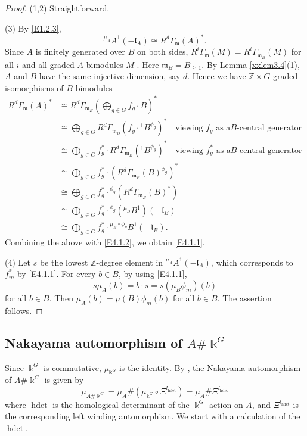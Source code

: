 \begin{proof}
(1,2) Straightforward.

(3) By \eqref{E1.2.3}, 
\begin{equation}
\label{E4.1.2}\tag{E4.1.2}
{^{\mu_A} A^1} (-{\mathfrak l}_A)\cong R^d 
\Gamma_{\mathfrak{m}}(A)^*.
\end{equation} 
Since $A$ is finitely generated over $B$ 
on both sides, $R^i\Gamma_{\mathfrak{m}}(M)=R^i\Gamma_{{\mathfrak{m}}_B}(M)$ for
all $i$ and all graded $A$-bimodules $M$ \cite{AZ}. Here ${\mathfrak{m}}_B=
B_{\geq 1}$. By Lemma \ref{xxlem3.4}(1),
$A$ and $B$ have the same injective dimension, say $d$.
Hence we have ${\mathbb Z}\times G$-graded isomorphisms
of $B$-bimodules
$$\begin{aligned}
R^d\Gamma_{\mathfrak{m}}(A)^*
&\cong R^d\Gamma_{{\mathfrak{m}}_B}(\bigoplus_{g\in G} f_g \cdot B)^*\\
&\cong \bigoplus_{g\in G} 
R^d\Gamma_{{\mathfrak{m}}_B}( f_g \cdot {^1 B^{\phi_g}})^* \quad {\text{viewing $f_g$ as a
$B$-central generator}}\\
&\cong \bigoplus_{g\in G} f_g^* \cdot R^d\Gamma_{{\mathfrak{m}}_B}({^1 B^{\phi_g}})^*
\quad {\text{viewing $f_g^*$ as a
$B$-central generator}}\\
&\cong \bigoplus_{g\in G} f_g^* \cdot (R^d\Gamma_{{\mathfrak{m}}_B}(B)^{\phi_g})^*\\
&\cong \bigoplus_{g\in G} f_g^* \cdot {^{\phi_g}(R^d\Gamma_{{\mathfrak{m}}_B}(B)^*)}\\
&\cong \bigoplus_{g\in G} f_g^* \cdot {^{\phi_g}(^{\mu_B} B^1)(-{\mathfrak l}_B)}\\
&\cong \bigoplus_{g\in G} f_g^* \cdot {^{\mu_B\circ \phi_g}B^1}(-{\mathfrak l}_B).
\end{aligned}
$$
Combining the above with \eqref{E4.1.2}, we obtain 
\eqref{E4.1.1}. 

(4) Let $s$ be the lowest ${\mathbb Z}$-degree element 
in ${^{\mu_A} A^1} (-{\mathfrak l}_A)$, which corresponds to $f_{m}^*$ 
by \eqref{E4.1.1}. For every $b\in B$, by using
\eqref{E4.1.1},
$$s\mu_A(b) =b\cdot s= s (\mu_B\phi_m)(b)$$
for all $b\in B$. Then $\mu_A(b)=\mu(B)\phi_{m}(b)$ 
for all $b\in B$. The assertion follows. 
\end{proof}

\subsection{Nakayama automorphism of $A\# \Bbbk^G$}
\label{xxsec4.2}
Since $\Bbbk^G$ is commutative, $\mu_{\Bbbk^G}$ is the identity.
By \cite[Theorem 0.2]{RRZ2}, the Nakayama automorphism of
$A\# \Bbbk^G$ is given by
$$\mu_{A\# \Bbbk^G}=\mu_A \# (\mu_{\Bbbk^G} \circ \Xi^l_\operatorname{hdet})
=\mu_A \# \Xi^l_\operatorname{hdet}$$
where $\operatorname{hdet}$ is the homological determinant of the 
$\Bbbk^G$-action on $A$, and $\Xi^l_\operatorname{hdet}$ is the corresponding 
left winding automorphism. We start with a calculation of
the $\operatorname{hdet}$.

